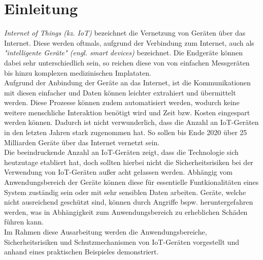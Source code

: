 \section{Einleitung}
\textit{Internet of Things (kz. IoT)} bezeichnet die Vernetzung von Geräten  über das Internet.
Diese werden oftmals, aufgrund der Verbindung zum Internet, auch als \textit{"intelligente Geräte" 
(engl. smart devices)} bezeichnet. Die Endgeräte können dabei sehr unterschiedlich sein, so reichen
diese von von einfachen Messgeräten bis hinzu komplexen medizinischen Implataten. \cite{paper}\\

Aufgrund der Anbindung der Geräte an das Internet, ist die Kommunikationen mit diesen 
einfacher und Daten können leichter extrahiert und übermittelt werden. Diese Prozesse
können zudem automatisiert werden, wodurch keine weitere menschliche Interaktion
benötigt wird und Zeit bzw. Kosten eingespart werden können. Dadurch ist nicht verwunderlich,
dass die Anzahl an IoT-Geräten in den letzten Jahren stark zugenommen hat. So sollen bis Ende
2020 über 25 Milliarden Geräte über das Internet vernetzt sein. \cite{paper}\\

Die beeindruckende Anzahl an IoT-Geräten zeigt, dass die Technologie sich heutzutage etabliert hat,
doch sollten hierbei nicht die Sicherheitsrisiken bei der Verwendung von IoT-Geräten außer acht
gelassen werden. Abhängig vom Anwendungsbereich der Geräte können diese für essentielle 
Funtkionalitäten eines System zuständig sein oder mit sehr sensiblen Daten arbeiten. 
Geräte, welche nicht ausreichend geschützt sind, können durch Angriffe bspw.  heruntergefahren
werden, was in Abhängigkeit zum Anwendungsbereich zu erheblichen Schäden führen kann. \cite{paper} \\

Im Rahmen diese Ausarbeitung werden die Anwendungsbereiche, Sicherheitsrisiken und Schutzmechanismen
von IoT-Geräten vorgestellt und anhand eines praktischen Beispieles demonstriert.


  



